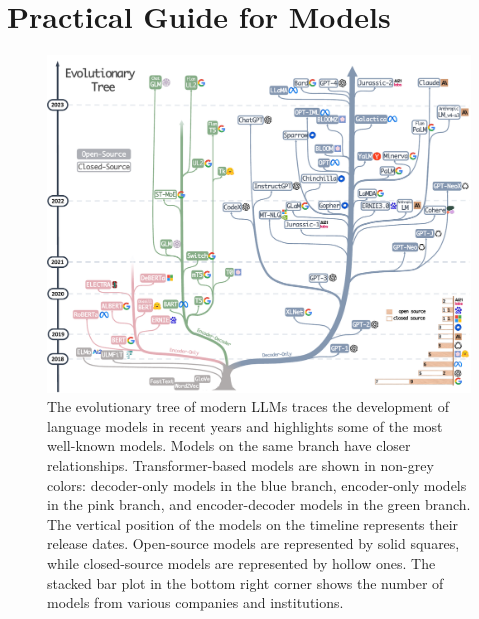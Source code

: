 \documentclass[manuscript,screen, nonacm]{acmart}
\begin{document}
\section{Practical Guide for Models}
\begin{figure}[tp]
  \begin{adjustwidth}{-0.0cm}{}
  \centering
    \includegraphics[width=1.00\textwidth]{./models-colorgrey-2.pdf}
   \end{adjustwidth} 
   \caption{The evolutionary tree of modern LLMs traces the development of language models in recent years and highlights some of the most well-known models. Models on the same branch have closer relationships. Transformer-based models are shown in non-\textcolor{YGrey}{grey} colors: decoder-only models in the \textcolor{GreyBlue2}{blue} branch, encoder-only models in the \textcolor{GreyPink2}{pink} branch, and encoder-decoder models in the \textcolor{GreyGreen2}{green} branch. The vertical position of the models on the timeline represents their release dates. Open-source models are represented by solid squares, while closed-source models are represented by hollow ones. The stacked bar plot in the bottom right corner shows the number of models from various companies and institutions.}\label{fig:tree}
\end{figure}
\end{document}
